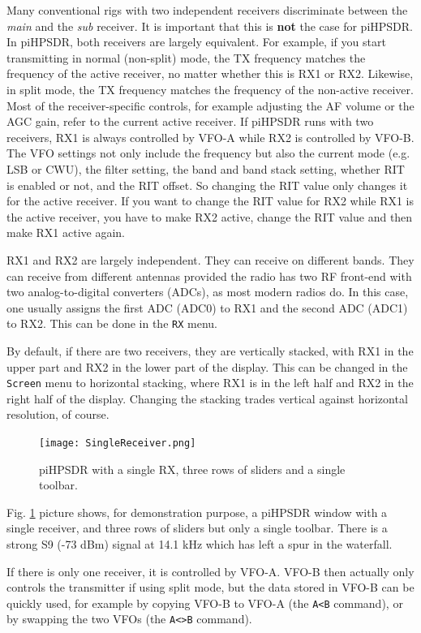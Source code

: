 \documentclass[12pt]{book}
\def\bltt#1{\texttt{\color{blue}#1}}
\def\pH{pi\-HPSDR\xspace}
\begin{document}
Many conventional rigs with two independent receivers discriminate
between the \textit{main} and the \textit{sub} receiver. It is important that
this is \textbf{not} the case for \pH. In \pH, both  receivers are
largely equivalent. For example, if you start transmitting in
normal (non-split) mode, the TX frequency matches the frequency
of the active receiver, no matter whether this is RX1 or RX2.
Likewise, in split mode, the TX frequency matches the frequency
of the non-active receiver. Most of the receiver-specific controls,
for example adjusting the AF volume or the AGC gain, refer to the
current active receiver. If \pH runs with two receivers,
RX1 is always controlled by VFO-A while RX2 is controlled by VFO-B.
The VFO settings not only include the frequency but also the
current mode (e.g. LSB or CWU), the filter setting, the band and
band stack setting, whether RIT is enabled or not, and the RIT
offset. So changing the RIT value only changes it for the active
receiver. If you want  to change the RIT value for RX2 while RX1 is
the active receiver, you have to make RX2 active, change the RIT
value and then make RX1 active again.

RX1 and RX2 are largely independent. They can receive on different
bands. They can receive from different antennas provided the radio
has two RF front-end with two analog-to-digital converters (ADCs),
as most modern radios do. In this case, one usually
assigns the first ADC (ADC0) to RX1 and the second ADC (ADC1) to
RX2. This can be done in the \bltt{RX} menu.

By default, if there are two receivers, they are vertically stacked,
with RX1 in the upper part and RX2 in the lower part of the display.
This can be changed in the \bltt{Screen} menu to horizontal stacking,
where RX1 is in the left half and RX2 in the right half of  the
display. Changing the stacking trades vertical against horizontal
resolution, of course.

\begin{figure}[ht]
\center
\texttt{[image: SingleReceiver.png]}
\caption{\pH with a single RX, three rows of sliders and a single toolbar.}
\label{fig:SingleReceiver}
\end{figure}

Fig. \ref{fig:SingleReceiver} picture shows, for demonstration purpose, a \pH
window with a single receiver, and three rows of sliders but only a single
toolbar. There is a strong S9 (-73 dBm) signal at 14.1 kHz which has left
a spur in the waterfall.

If there is only one receiver, it is controlled
by VFO-A. VFO-B then actually only controls the transmitter
if using split mode, but the data stored in VFO-B can
be quickly used, for example by copying VFO-B to VFO-A (the
\bltt{A<B} command), or by swapping the two VFOs (the \bltt{A<>B} command).
\end{document}
